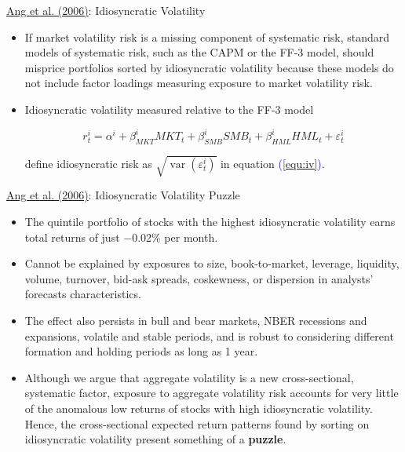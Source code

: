 \documentclass{beamer}
\begin{document}
\begin{frame}{\href{https://doi.org/10.1111/j.1540-6261.2006.00836.x}{Ang et al. (2006)}: Idiosyncratic Volatility}
\begin{itemize}
	\item If market volatility risk is a missing component of systematic risk, standard models of systematic risk, such as the CAPM or the FF-3 model, should misprice portfolios sorted by idiosyncratic volatility because these models do not include factor loadings measuring exposure to market volatility risk.
	\item Idiosyncratic volatility measured relative to the FF-3 model

	\begin{equation}\label{equ:iv}
		r_{t}^{i}=\alpha^{i}+\beta_{M K T}^{i} M K T_{t}+\beta_{S M B}^{i} S M B_{t}+\beta_{H M L}^{i} H M L_{t}+\varepsilon_{t}^{i}
	\end{equation}

	define idiosyncratic risk as $\sqrt{\operatorname{var}\left(\varepsilon_{t}^{i}\right)}$ in equation \textcolor{blue}{(\ref{equ:iv})}.
\end{itemize}
\end{frame}

\begin{frame}{\href{https://doi.org/10.1111/j.1540-6261.2006.00836.x}{Ang et al. (2006)}: Idiosyncratic Volatility Puzzle}
\begin{itemize}
	\item The quintile portfolio of stocks with the highest idiosyncratic volatility earns total returns of just −0.02\% per month.
	\item Cannot be explained by exposures to size, book-to-market, leverage, liquidity, volume, turnover, bid-ask spreads, coskewness, or dispersion in analysts' forecasts characteristics.
	\item The effect also persists in bull and bear markets, NBER recessions and expansions, volatile and stable periods, and is robust to considering different formation and holding periods as long as 1 year.
	\item Although we argue that aggregate volatility is a new cross-sectional, systematic factor, exposure to aggregate volatility risk accounts for very little of the anomalous low returns of stocks with high idiosyncratic volatility. Hence, the cross-sectional expected return patterns found by sorting on idiosyncratic volatility present something of a \textbf{puzzle}.
\end{itemize}
\end{frame}
\end{document}
